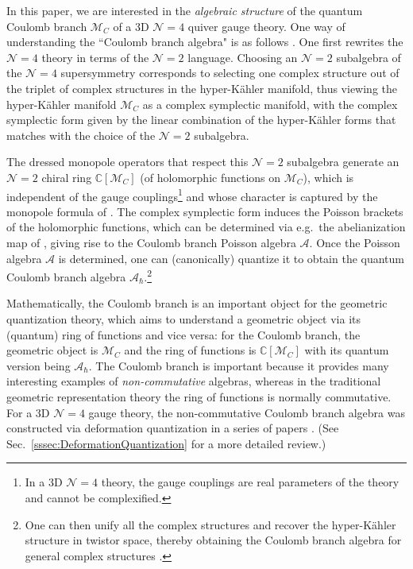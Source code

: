 \documentclass[12pt,a4paper]{article}
\renewcommand{\(}{\left(}
\renewcommand{\)}{\right)}
\renewcommand{\(}{\left(}
\renewcommand{\)}{\right)}
\begin{document}
\medskip

In this paper, we are interested in the \textit{algebraic structure} of the quantum Coulomb branch $\mathcal{M}_{C}$ of a 3D $\mathcal{N}=4$ quiver gauge theory.
One way of understanding the ``Coulomb branch algebra" is as follows \cite{bullimore2015coulomb}. 
One first rewrites the $\mathcal{N}=4$ theory in terms of the $\mathcal{N}=2$ language.
Choosing an $\mathcal{N}=2$ subalgebra of the $\mathcal{N}=4$ supersymmetry corresponds to selecting one complex structure out of the triplet of complex structures in the hyper-K\"ahler manifold, thus viewing the hyper-K\"ahler manifold $\mathcal{M}_C$ as a complex symplectic manifold, with the complex symplectic form given by the linear combination of the hyper-K\"ahler forms that matches with the choice of the  $\mathcal{N}=2$ subalgebra. 


The dressed monopole operators that respect this $\mathcal{N}=2$ subalgebra generate an $\mathcal{N}=2$ chiral ring $\mathbb{C}[\mathcal{M}_C]$ (of holomorphic functions on $\mathcal{M}_C$), which is independent of the gauge couplings\footnote{In a 3D $\mathcal{N}=4$ theory, the gauge couplings are real parameters of the theory and cannot be complexified.} and whose character is captured by the monopole formula of \cite{Cremonesi_2014}.
The complex symplectic form induces the Poisson brackets of the holomorphic functions, which can be determined via e.g.\ the abelianization map of \cite{bullimore2015coulomb}, giving rise to the  Coulomb branch Poisson algebra $\mathcal{A}$.
Once the Poisson algebra $\mathcal{A}$  is determined, one can (canonically) quantize it to obtain the quantum Coulomb branch algebra $\mathcal{A}_{\hbar}$.\footnote{One can then unify all the complex structures and recover the hyper-K\"ahler structure in twistor space, thereby obtaining the Coulomb branch algebra for general complex structures \cite{bullimore2015coulomb}.}

\medskip

Mathematically, the Coulomb branch is an important object for the geometric quantization theory, which aims to understand a geometric object via its (quantum) ring of functions and vice versa: for the Coulomb branch, the geometric object is $\mathcal{M}_C$ and the ring of functions is $\mathbb{C}[\mathcal{M}_C]$ with its quantum version being $\mathcal{A}_{\hbar}$. 
The Coulomb branch is important because it provides many interesting examples of \textit{non-commutative} algebras, whereas in the traditional geometric representation theory the ring of functions is normally commutative. 
For a 3D $\mathcal{N}=4$ gauge theory, the non-commutative Coulomb branch algebra was constructed via deformation quantization in a series of papers \cite{Nakajima:2015txa,Braverman:2016wma,Braverman:2016pwk,braverman2024ringobjectsequivariantderived}.
(See Sec.~\ref{sssec:DeformationQuantization} for a more detailed review.)
\end{document}

